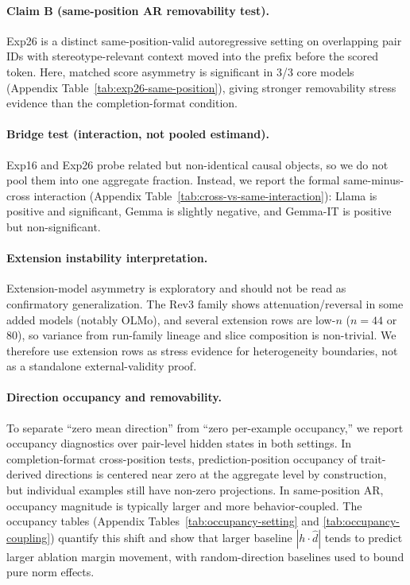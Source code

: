 \paragraph{Claim B (same-position AR removability test).}
Exp26 is a distinct same-position-valid autoregressive setting on overlapping pair IDs with stereotype-relevant context moved into the prefix before the scored token. Here, matched score asymmetry is significant in 3/3 core models (Appendix Table~\ref{tab:exp26-same-position}), giving stronger removability stress evidence than the completion-format condition.

\paragraph{Bridge test (interaction, not pooled estimand).}
Exp16 and Exp26 probe related but non-identical causal objects, so we do not pool them into one aggregate fraction. Instead, we report the formal same-minus-cross interaction (Appendix Table~\ref{tab:cross-vs-same-interaction}): Llama is positive and significant, Gemma is slightly negative, and Gemma-IT is positive but non-significant.

\paragraph{Extension instability interpretation.}
Extension-model asymmetry is exploratory and should not be read as confirmatory generalization. The Rev3 family shows attenuation/reversal in some added models (notably OLMo), and several extension rows are low-$n$ ($n=44$ or $80$), so variance from run-family lineage and slice composition is non-trivial. We therefore use extension rows as stress evidence for heterogeneity boundaries, not as a standalone external-validity proof.

\paragraph{Direction occupancy and removability.}
To separate ``zero mean direction'' from ``zero per-example occupancy,'' we report occupancy diagnostics over pair-level hidden states in both settings. In completion-format cross-position tests, prediction-position occupancy of trait-derived directions is centered near zero at the aggregate level by construction, but individual examples still have non-zero projections. In same-position AR, occupancy magnitude is typically larger and more behavior-coupled. The occupancy tables (Appendix Tables~\ref{tab:occupancy-setting} and \ref{tab:occupancy-coupling}) quantify this shift and show that larger baseline $|h\cdot \hat d|$ tends to predict larger ablation margin movement, with random-direction baselines used to bound pure norm effects.

